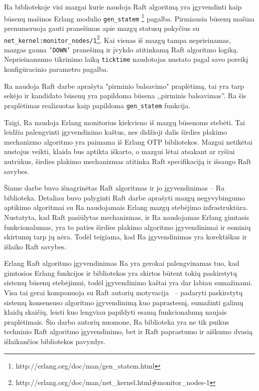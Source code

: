 \documentclass{VUMIFPSkursinis}
\begin{document}
Ra bibliotekoje visi mazgai kurie naudoja Raft algoritmą yra įgyvendinti kaip būsenų mašinos Erlang modulio \texttt{gen\_statem} \footnote{http://erlang.org/doc/man/gen\_statem.html} pagalba. 
Pirmiausia būsenų mašina  prenumeruoja gauti pranešimus apie mazgų statusų pokyčius su \texttt{net\_kernel:monitor\_nodes/1}\footnote{http://erlang.org/doc/man/net\_kernel.html\#monitor\_nodes-1}. Kai vienas iš mazgų tampa neprieinamas, mazgas gauna \texttt{'DOWN'} pranešimą ir įvykdo atitinkamą Raft algoritmo logiką. Neprieinamumo tikrinimo laiką \texttt{ticktime} naudotojas nustato pagal savo poreikį konfigūracinio parametro pagalba.

Ra naudoja Raft darbe aprašyta "pirminio balsavimo" praplėtimą, tai yra tarp sekėjo ir kandidato būsenų yra papildoma būsena ,,pirminis balsavimas''. Ra šis praplėtimas realizuotas kaip papildoma \texttt{gen\_statem} funkcija.

Taigi, Ra naudoja Erlang monitorius kiekvieno iš mazgų būsenoms stebėti. Tai leidžia palengvinti įgyvendinimo kaštus, nes didžioji dalis širdies plakimo mechanizmo algoritmo yra paimama iš Erlang OTP bibliotekos. Mazgui netikėtai nustojus veikti, klaida bus aptikta iškarto, o mazgui lėtai atsakant ar ryšiui nutrūkus, širdies plakimo mechanizmas atitinka Raft specifikaciją ir išsaugo Raft savybes.


Šiame darbe buvo išnagrinėtas Raft algoritmas ir jo įgyvendinimas -- Ra biblioteka. Detaliau buvo palyginti Raft darbe aprašyti mazgų negyvybingumo aptikimo algoritmai su Ra naudojamais Erlang mazgų stebėjimo infrastruktūra. Nustatyta, kad Raft pasiūlytas mechanizmas, ir Ra naudojamas Erlang gimtasis funkcionalumas, yra to paties širdies plakimo algoritmo įgyvendinimai ir esminių skirtumų tarp jų nėra. Todėl teigiama, kad Ra įgyvendinimas yra korektiškas ir išlaiko Raft savybes.

Erlang Raft algoritmo įgyvendinimas Ra yra gerokai palengvinamas tuo, kad gimtosios Erlang funkcijos ir bibliotekos yra skirtos būtent tokių paskirstytų sistemų būsenų stebėjimui, todėl įgyvendinimo kaštai yra dar labiau sumažinami. Visa tai gerai komponuoja su Raft autorių motyvacija~\cite{ongaro_consensus} -- padaryti paskirstytų sistemų konsensuso algoritmo įgyvendinimą kuo paprastesnį, sumažinti galimų klaidų skaičių, leisti kuo lengviau papildyti esamą funkcionalumą naujais praplėtimais. Šio darbo autorių nuomone, Ra biblioteka yra ne tik puikus techninio Raft algoritmo įgyvendinimo, bet ir Raft paprastumo ir aiškumo dvasią išlaikančios bibliotekos pavyzdys. 
\end{document}
